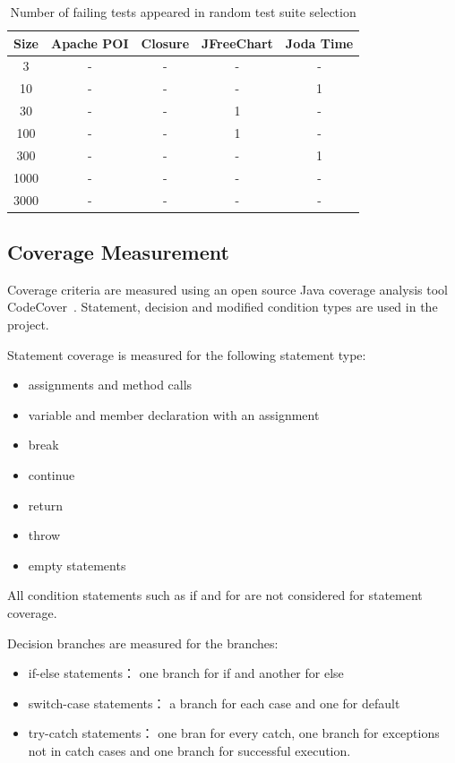 \begin{table}[h]
	\caption{Number of failing tests appeared in random test suite selection}
	\label{tab:failtest}
	\begin{minipage}{\columnwidth}
		\begin{center}
			\begin{tabular}{c|c|c|c|c}
				\hline
				Size & Apache POI & Closure & JFreeChart & Joda Time \\
				\hline
				3 & - & - & - & - \\
				10 & - & - & - & 1 \\
				30 & - & - & 1 & - \\
				100 & - & - & 1 & - \\
				300 & - & - & - & 1 \\
				1000 & - & - & - & - \\
				3000 & - & - & - & - \\
				\hline
			\end{tabular}
		\end{center}
		\bigskip
	\end{minipage}
\end{table}

\subsection{Coverage Measurement}
Coverage criteria are measured using an open source Java coverage analysis tool CodeCover~\cite{codecover}. Statement, decision and modified condition types are used in the project.

Statement coverage is measured for the following statement type:
\begin{itemize}
	\item assignments and method calls
	\item variable and member declaration with an assignment
	\item break
	\item continue
	\item return
	\item throw
	\item empty statements
\end{itemize}

All condition statements such as if and for are not considered for statement coverage.

Decision branches are measured for the branches:
	\begin{itemize}
		\item if-else statements： one branch for if and another for else
		\item switch-case statements： a branch for each case and one for default
		\item try-catch statements： one bran for every catch, one branch for exceptions not in catch cases and one branch for successful execution.
	\end{itemize}

